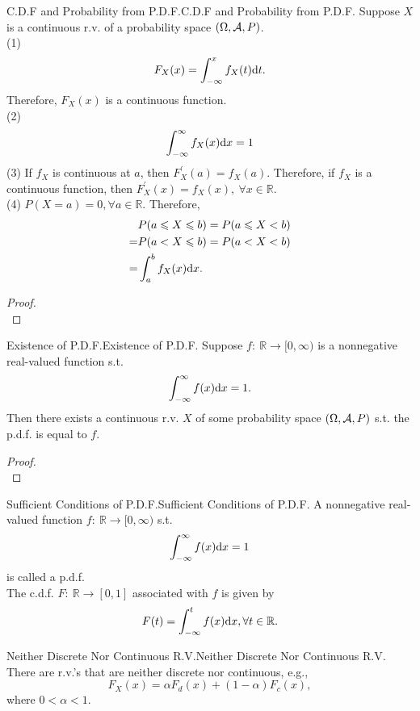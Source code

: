 \documentclass{elegantbook}
\begin{document}
\begin{theorem}{C.D.F and Probability from P.D.F.}{C.D.F and Probability from P.D.F.}
Suppose $X$ is a continuous r.v. of a probability space $(\Omega,\mathcal{A}, P)$.\\
(1)
$$
F_X(x)=\int_{-\infty}^{x}{f_X(t)\dif t}.
$$
   Therefore, $F_X(x)$ is a continuous function.\\
(2)
$$
\int_{-\infty}^{\infty}{f_X(x)\dif x}=1
$$
(3) If $f_X$ is continuous at $a$, then $F_X^\prime(a)=f_X(a)$. Therefore, if $f_X$ is a continuous function, then $F_X^\prime(x)=f_X(x),\ \forall x\in\mathbb{R}$.\\
(4) $P(X=a)=0,\forall a\in\mathbb{R}$. Therefore,
$$\begin{aligned}
&P(a\ls X\ls b)=P(a\ls X<b)\\
=&P(a<X\ls b)=P(a<X<b)\\
=&\int_{a}^{b}{f_X(x)\dif x}.
\end{aligned}
$$
\end{theorem}

\begin{proof}
\\[4cm]\vspace{0.01cm}
\end{proof}

\begin{theorem}{Existence of P.D.F.}{Existence of P.D.F.}
Suppose $f:\ \mathbb{R}\rightarrow[0,\infty)$ is a nonnegative real-valued function s.t.
$$
\int_{-\infty}^{\infty}{f(x)\dif x}=1.
$$
Then there exists a continuous r.v. $X$ of some probability space $(\Omega,\mathcal{A}, P)$ s.t. the p.d.f. is equal to $f$.
\end{theorem}

\begin{proof}
\\[4cm]\vspace{0.01cm}
\end{proof}

\begin{definition}{Suf\/f\/icient Conditions of P.D.F.}{Sufficient Conditions of P.D.F.}
A nonnegative real-valued function $f:\ \mathbb{R}\rightarrow[0,\infty)$ s.t.
$$
\int_{-\infty}^{\infty}{f(x)\dif x}=1
$$
is called a p.d.f. \\
The c.d.f. $F:\ \mathbb{R}\rightarrow[0,1]$ associated with $f$ is given by
$$
F(t)=\int_{-\infty}^{t}{f(x)\dif x},\forall t\in\mathbb{R}.
$$
\end{definition}

\begin{remark}{Neither Discrete Nor Continuous R.V.}{Neither Discrete Nor Continuous R.V.}
There are r.v.'s that are neither discrete nor continuous, e.g., $$F_X(x)=\alpha F_d(x)+(1-\alpha)F_c(x),$$
where $0<\alpha<1$.
\end{remark}
\end{document}
